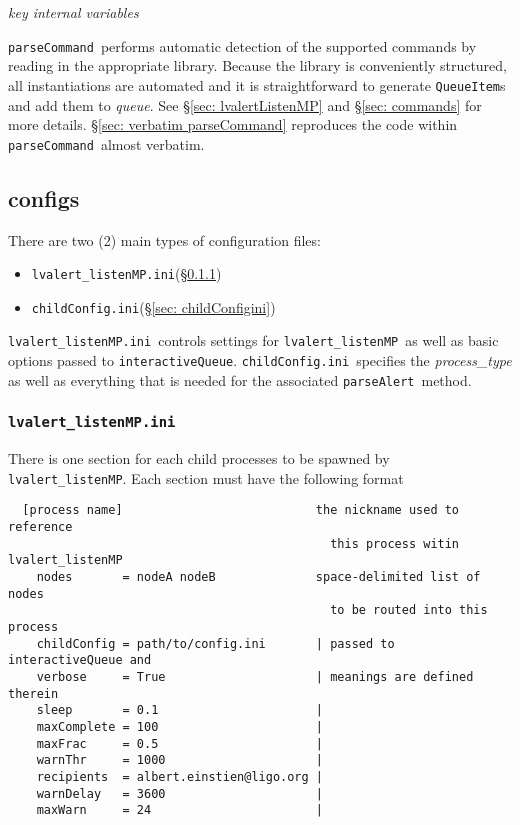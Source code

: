 \documentclass{article}
\newcommand{\lvalertListenMP}{\texttt{lvalert\_listenMP}}
\newcommand{\interactiveQueue}{\texttt{interactiveQueue}}
\newcommand{\parseAlert}{\texttt{parseAlert}}
\newcommand{\parseCommand}{\texttt{parseCommand}}
\newcommand{\QueueItem}{\texttt{QueueItem}}
\newcommand{\lvalertMPini}{\texttt{lvalert\_listenMP.ini}}
\newcommand{\childConfigini}{\texttt{childConfig.ini}}
\begin{document}
\noindent
\textit{key internal variables}

\parseCommand~performs automatic detection of the supported commands by reading in the appropriate library. 
Because the library is conveniently structured, all instantiations are automated and it is straightforward to generate {\QueueItem}s and add them to \textit{queue}.
See \S\ref{sec: lvalertListenMP} and \S\ref{sec: commands} for more details.
\S\ref{sec: verbatim parseCommand} reproduces the code within \parseCommand~almost verbatim.


\subsection{configs}
\label{sec: configs}

There are two (2) main types of configuration files:
\begin{itemize}
    \item{\lvalertMPini (\S\ref{sec: lvalertMPini})}
    \item{\childConfigini (\S\ref{sec: childConfigini})}
\end{itemize}
\lvalertMPini~controls settings for \lvalertListenMP~as well as basic options passed to \interactiveQueue.
\childConfigini~specifies the \textit{process\_type} as well as everything that is needed for the associated \parseAlert~method.


\subsubsection{\lvalertMPini}
\label{sec: lvalertMPini}

There is one section for each child processes to be spawned by \lvalertListenMP.
Each section must have the following format

\begin{verbatim}
  [process name]                           the nickname used to reference 
                                             this process witin lvalert_listenMP
    nodes       = nodeA nodeB              space-delimited list of nodes 
                                             to be routed into this process
    childConfig = path/to/config.ini       | passed to interactiveQueue and 
    verbose     = True                     | meanings are defined therein
    sleep       = 0.1                      |
    maxComplete = 100                      |
    maxFrac     = 0.5                      |
    warnThr     = 1000                     | 
    recipients  = albert.einstien@ligo.org |
    warnDelay   = 3600                     |
    maxWarn     = 24                       |
\end{verbatim}
\end{document}
